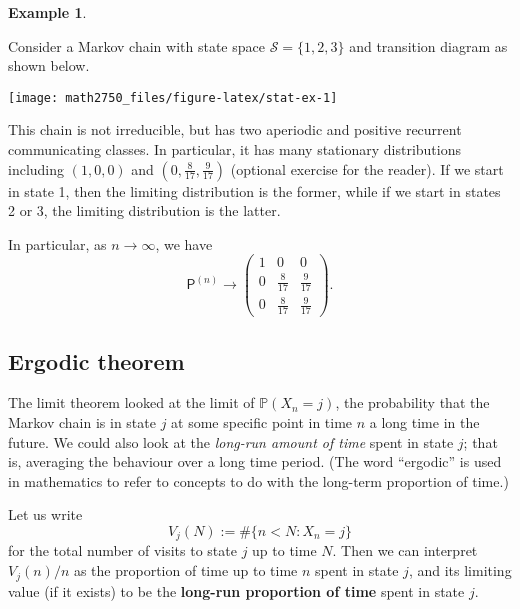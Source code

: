 \documentclass[
  a4paper,
]{article}
\theoremstyle{definition}
\theoremstyle{definition}
\newtheorem{example}{Example}[section]
\theoremstyle{definition}
\theoremstyle{remark}
\begin{document}
\begin{example}
\protect\hypertarget{exm:conv5}{}\label{exm:conv5}

Consider a Markov chain with state space \(\mathcal S = \{1,2,3\}\) and transition diagram as shown below.

\begin{center}\texttt{[image: math2750\_files/figure-latex/stat-ex-1]} \end{center}

This chain is not irreducible, but has two aperiodic and positive recurrent communicating classes. In particular, it has many stationary distributions including \((1, 0, 0)\) and \((0, \frac8{17}, \frac9{17})\) (optional exercise for the reader). If we start in state 1, then the limiting distribution is the former, while if we start in states 2 or 3, the limiting distribution is the latter.

In particular, as \(n \to \infty\), we have
\[ \mathsf P^{(n)} \to \begin{pmatrix} 1 & 0 & 0 \\ 0 & \frac8{17} & \frac9{17} \\ 0 & \frac8{17} & \frac9{17} \end{pmatrix}. \]

\end{example}

\hypertarget{S11-ergodic}{%
\subsection{Ergodic theorem}\label{S11-ergodic}}

The limit theorem looked at the limit of \(\mathbb P(X_n = j)\), the probability that the Markov chain is in state \(j\) at some specific point in time \(n\) a long time in the future. We could also look at the \emph{long-run amount of time} spent in state \(j\); that is, averaging the behaviour over a long time period. (The word ``ergodic'' is used in mathematics to refer to concepts to do with the long-term proportion of time.)

Let us write
\[ V_j(N) := \# \big\{ n < N : X_n = j \} \]
for the total number of visits to state \(j\) up to time \(N\). Then we can interpret \(V_j(n)/n\) as the proportion of time up to time \(n\) spent in state \(j\), and its limiting value (if it exists) to be the \textbf{long-run proportion of time} spent in state \(j\).
\end{document}
